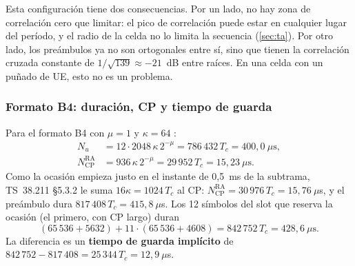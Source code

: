 Esta configuración tiene dos consecuencias. Por un lado, no hay zona de correlación cero que limitar: el pico de correlación puede estar en cualquier lugar del período, y el radio de la celda no lo limita la secuencia (\cref{sec:ta}). Por otro lado, los preámbulos ya no son ortogonales entre sí, sino que tienen la correlación cruzada constante de $1/\sqrt{139}\approx -21$~dB entre raíces. En una celda con un puñado de UE, esto no es un problema.

\subsubsection{Formato B4: duración, CP y tiempo de guarda}
Para el formato B4 con $\mu=1$ y $\kappa=64$ \cite[tabla~6.3.3.1-2]{ts38211}:
\begin{align}
N_u &= 12\cdot 2048\,\kappa\, 2^{-\mu} = 786\,432\,T_c = 400{,}0~\mu\text{s},\\
N_\text{CP}^\text{RA} &= 936\,\kappa\, 2^{-\mu} = 29\,952\,T_c = 15{,}23~\mu\text{s}.
\end{align}
Como la ocasión empieza justo en el instante de 0,5~ms de la subtrama, TS~38.211 §5.3.2 le suma $16\kappa = 1024\,T_c$ al CP: $N_\text{CP}^\text{RA} = 30\,976\,T_c = 15{,}76~\mu$s, y el preámbulo dura $817\,408\,T_c = 415{,}8~\mu$s. Los 12 símbolos del slot que reserva la ocasión (el primero, con CP largo) duran
\begin{equation}
(65\,536 + 5632) + 11\cdot(65\,536 + 4608) = 842\,752\,T_c = 428{,}6~\mu\text{s}.
\end{equation}
La diferencia es un \textbf{tiempo de guarda implícito} de $842\,752 - 817\,408 = 25\,344\,T_c = 12{,}9~\mu$s.

